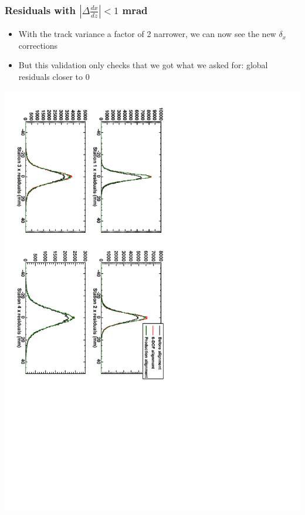 \documentclass[compress]{beamer}
\begin{document}
\begin{frame}
\frametitle{Residuals with $|\Delta \frac{dx}{dz}| < 1$ mrad}

\begin{itemize}
\item With the track variance a factor of 2 narrower, we can now see the new $\delta_x$ corrections
\item But this validation only checks that we got what we asked for: global residuals closer to 0
\end{itemize}

\vfill
\includegraphics[height=\linewidth, angle=90]{residuals_cut1x.pdf}

\end{frame}
\end{document}
